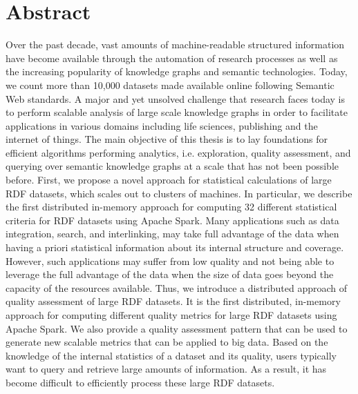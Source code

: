 \chapter*{Abstract}

Over the past decade, vast amounts of machine-readable structured information have become available through the automation of research processes as well as the increasing popularity of knowledge graphs and semantic technologies. 
Today, we count more than 10,000 datasets made available online following Semantic Web standards.
A major and yet unsolved challenge that research faces today is to perform scalable analysis of large scale knowledge graphs in order to facilitate applications in various domains including life sciences, publishing and the internet of things.
The main objective of this thesis is to lay foundations for efficient algorithms performing analytics, i.e. exploration, quality assessment, and querying over semantic knowledge graphs at a scale that has not been possible before.
First, we propose
a novel approach for statistical calculations of large RDF datasets, which scales out to clusters of machines. 
In particular, we describe the first distributed in-memory approach for computing 32 different statistical criteria for RDF datasets using Apache Spark.
Many applications such as data integration, search, and interlinking, may take full advantage of the data when having a priori statistical information about its internal structure and coverage.
However, such applications may suffer from low quality and not being able to leverage the full advantage of the data when the size of data goes beyond the capacity of the resources available.
Thus, we introduce 
a distributed approach of quality assessment of large RDF datasets.
It is the first distributed, in-memory approach for computing different quality metrics for large RDF datasets using Apache Spark. We also provide a quality assessment pattern that can be used to generate new scalable metrics that can be applied to big data.
Based on the knowledge of the internal statistics of a dataset and its quality, users typically want to query and retrieve large amounts of information.
As a result, it has become difficult to efficiently process these large RDF datasets.
